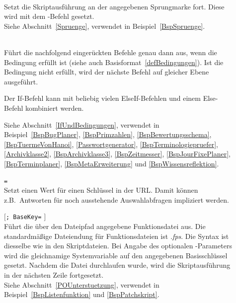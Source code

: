 \begin{description}
\item[] \\
Setzt die Skriptausführung an der angegebenen Sprungmarke fort. Diese wird mit dem -Befehl gesetzt.\\
Siehe Abschnitt~\ref{Spruenge}, verwendet in Beispiel~\ref{BspSpruenge}.

\item[] \\
Führt die nachfolgend eingerückten Befehle genau dann aus, wenn die Bedingung erfüllt ist (siehe auch Basisformat~\ref{defBedingungen}). 
Ist die Bedingung nicht erfüllt, wird der nächste Befehl auf gleicher Ebene ausgeführt.\par
Der If-Befehl kann mit beliebig vielen ElseIf-Befehlen und einem Else-Befehl kombiniert werden.

Siehe Abschnitt~\ref{IfUndBedingungen}, verwendet in Beispiel~\ref{BspBugPlaner}, \ref{BspPrimzahlen}, \ref{BspBewertungsschema}, \ref{BspTuermeVonHanoi}, \ref{Passwortgenerator}, \ref{BspTerminologiepruefer}, \ref{Archivklasse2}, \ref{BspArchivklasse3}, \ref{BspZeitmesser}, \ref{BspJourFixePlaner}, \ref{BspTerminplaner}, \ref{BspMetaErweiterung} und \ref{BspWissensreflektion}.
 
\item[]  \verb|=| \\
Setzt einen Wert für einen Schlüssel in der URL. Damit können z.B.\ Antworten für noch ausstehende Auswahlabfragen impliziert werden.
 
\item[]  $[$\verb|; BaseKey=| $]$\\
Führt die über den Dateipfad angegebene Funktionsdatei aus. Die standardmäßige Dateiendung für Funktionsdateien ist \emph{.fps}. Die Syntax ist diesselbe wie in den Skriptdateien.
Bei Angabe des optionalen -Parameters wird die gleichnamige Systemvariable auf den angegebenen Basisschlüssel gesetzt. Nachdem die Datei durchlaufen wurde, wird die Skriptausführung in der nächsten Zeile fortgesetzt.\\
Siehe Abschnitt~\ref{POUnterstuetzung}, verwendet in Beispiel~\ref{BspListenfunktion} und \ref{BspPatchskript}.


\end{description}
